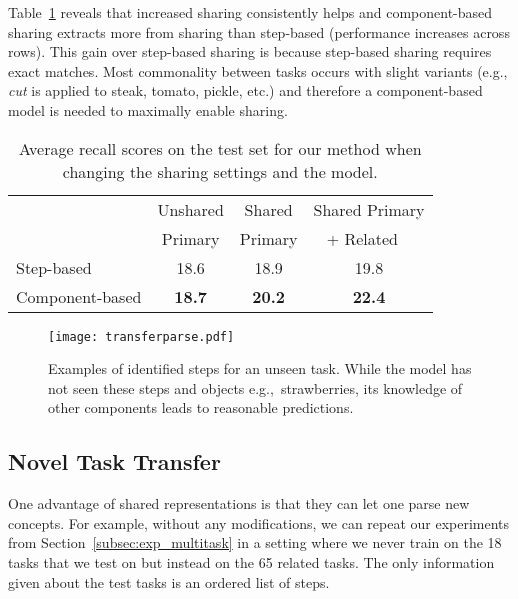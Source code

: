 \documentclass[10pt,twocolumn,letterpaper]{article}
\begin{document}
Table~\ref{tab:step_vs_attr} reveals that increased sharing consistently helps and component-based
sharing extracts more from sharing than step-based (performance increases across rows). This gain over
step-based sharing is because step-based sharing requires exact matches.
Most commonality between tasks occurs with slight variants (e.g., {\it cut} is
applied to steak, tomato, pickle, etc.) and therefore a component-based
model is needed to maximally enable sharing.

\begin{table}
\caption{
Average recall scores on the test set for our method when changing the sharing settings and the model.
}
\label{tab:step_vs_attr}
\begin{tabular}{lccc} \toprule
     & \small Unshared & \small Shared & \small Shared Primary \\
     & \small Primary & \small Primary & \small + Related \
     \\ \midrule
Step-based      & 18.6          & 18.9          & 19.8 \\
Component-based & \textbf{18.7} & \textbf{20.2} & \textbf{22.4} \\
\bottomrule
\end{tabular}
\vspace{-0.1in}
\end{table}

\begin{figure}[t]
\begin{center}
   \texttt{[image: transferparse.pdf]}
   \caption{Examples of identified steps for an unseen task. While the model has not seen these steps
and objects e.g.,~strawberries, its knowledge of other components leads to reasonable predictions.}
   \label{fig:transferred}
\end{center}
\vspace{-0.2in}
\end{figure}

\subsection{Novel Task Transfer}
\label{subsec:exp_transfer}

One advantage of shared representations is that they can let one parse
new concepts. For example, without any modifications, we can repeat our
experiments from Section~\ref{subsec:exp_multitask} in a setting where we
never train on the 18 tasks that we test on but instead on
the 65 related tasks.
The only information given about the test tasks is an ordered list of steps.
\end{document}
